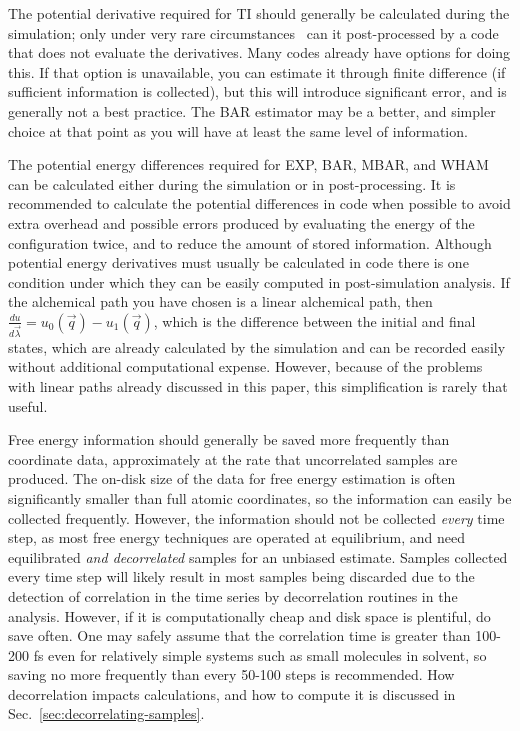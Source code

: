 \documentclass[9pt,bestpractices]{livecoms}
\begin{document}
The potential derivative required for TI should generally be calculated during the simulation; only under very rare circumstances~\cite{naden2015linear} can it post-processed by a code that does not evaluate the derivatives. Many codes already have options for doing this.
If that option is unavailable, you can estimate it through finite difference (if sufficient information is collected), but this will introduce significant error, and is generally not a best practice. The BAR estimator may be a better, and simpler choice at that point as you will have at least the same level of information. 

The potential energy differences required for EXP, BAR, MBAR, and WHAM can be calculated either during the simulation or in post-processing. It is recommended to calculate the potential differences in code when possible to avoid extra overhead and possible errors produced by evaluating the energy of the configuration twice, and to reduce the amount of stored information. 
Although potential energy derivatives must usually be calculated in code there is one condition under which they can be easily computed in post-simulation analysis. 
If the alchemical path you have chosen is a linear alchemical path, then $\frac{du}{d\vec{\lambda}} = u_0(\vec{q}) - u_1(\vec{q})$, which is the difference between the initial and final states, which are already calculated by the simulation and can be recorded easily without additional computational expense. 
However, because of the problems with linear paths already discussed in this paper, this simplification is rarely that useful.


Free energy information should generally be saved more frequently than coordinate data, approximately at the rate that uncorrelated samples are produced.  
The on-disk size of the data for free energy estimation is often significantly smaller than full atomic coordinates, so the information can easily be collected frequently. 
However, the information should not be collected \textit{every} time step, as most free energy techniques are operated at equilibrium, and need equilibrated \textit{and decorrelated} samples for an unbiased estimate.
Samples collected every time step will likely result in most samples being discarded due to the detection of correlation in the time series by decorrelation routines in the analysis. However, if it is computationally cheap and disk space is plentiful, do save often. One may safely assume that the correlation time is greater than 100-200 fs even for relatively simple systems such as small molecules in solvent, so saving no more frequently than every 50-100 steps is recommended. 
How decorrelation impacts calculations, and how to compute it is discussed in Sec.~\ref{sec:decorrelating-samples}.
\end{document}
